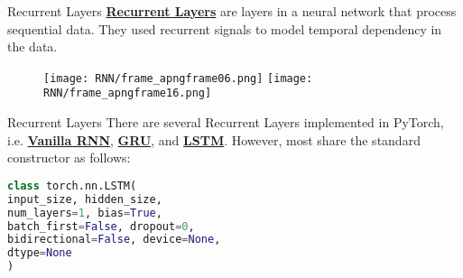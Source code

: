 \documentclass{beamer}
\begin{document}
\begin{frame}[fragile]{Recurrent Layers}
    \href{https://pytorch.org/docs/stable/nn.html#recurrent-layers}{\textbf{Recurrent Layers}} are layers in a neural network that process sequential data. They used recurrent signals to model temporal dependency in the data.
    \begin{figure}
        \begin{overprint}
            \centering\texttt{[image: RNN/frame\_apngframe06.png]}
            \centering\texttt{[image: RNN/frame\_apngframe16.png]}
        \end{overprint}
    \end{figure}
\end{frame}
\begin{frame}[fragile]{Recurrent Layers}
    There are several Recurrent Layers implemented in PyTorch, i.e. \href{https://pytorch.org/docs/stable/generated/torch.nn.RNN.html}{\textbf{Vanilla RNN}}, \href{https://pytorch.org/docs/stable/generated/torch.nn.GRU.html}{\textbf{GRU}}, and \href{https://pytorch.org/docs/stable/generated/torch.nn.LSTM.html}{\textbf{LSTM}}. However, most share the standard constructor as follows:
    \begin{exampleblock}{}
        \begin{lstlisting}[language=Python]
class torch.nn.LSTM(
input_size, hidden_size,
num_layers=1, bias=True,
batch_first=False, dropout=0,
bidirectional=False, device=None,
dtype=None
)
        \end{lstlisting}
    \end{exampleblock}
\end{frame}
\end{document}
